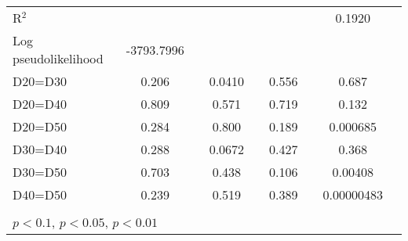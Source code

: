 \begin{tabular}{l|cccccc|cc}
R$^2$      &                  &         &                  &         &                  &         &   0.1920       &   \\ 
Log pseudolikelihood  & -3793.7996   &         &                  &         &                  &         &           &   \\ 
D20=D30         &    0.206         &         &   0.0410         &         &    0.556         &         &    0.687         &         \\
D20=D40         &    0.809         &         &    0.571         &         &    0.719         &         &    0.132         &         \\
D20=D50         &    0.284         &         &    0.800         &         &    0.189         &         & 0.000685         &         \\
D30=D40         &    0.288         &         &   0.0672         &         &    0.427         &         &    0.368         &         \\
D30=D50         &    0.703         &         &    0.438         &         &    0.106         &         &  0.00408         &         \\
D40=D50         &    0.239         &         &    0.519         &         &    0.389         &         &0.00000483         &         \\
\hline\hline
\multicolumn{9}{p{16cm}}{\tiny }\\
\multicolumn{9}{l}{\tiny \sym{*} \(p<0.1\), \sym{**} \(p<0.05\), \sym{***} \(p<0.01\)}\\
\end{tabular}